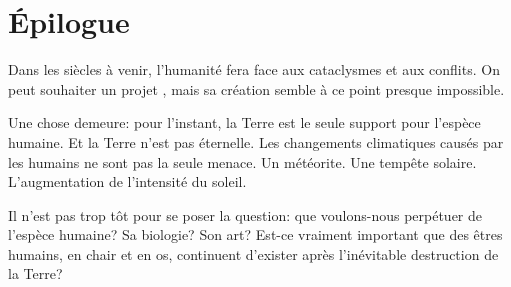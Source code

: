 \chapter*{Épilogue}

Dans les siècles à venir, l'humanité fera face aux cataclysmes et aux conflits.
On peut souhaiter un projet \nomProjet{}, mais sa création semble à ce point
presque impossible.

Une chose demeure: pour l'instant, la Terre est le seule support pour l'espèce
humaine.  Et la Terre n'est pas éternelle. Les changements climatiques causés
par les humains ne sont pas la seule menace.  Un météorite. Une tempête solaire.
L'augmentation de l'intensité du soleil.

Il n'est pas trop tôt pour se poser la question: que voulons-nous perpétuer de
l'espèce humaine?  Sa biologie? Son art? Est-ce vraiment important que des
êtres humains, en chair et en os, continuent d'exister après l'inévitable
destruction de la Terre?

